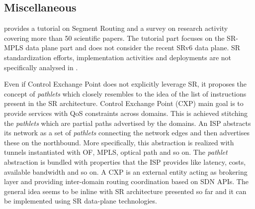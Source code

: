 \subsection{Miscellaneous}


\cite{abdullah2018segment} provides a tutorial on Segment Routing and a survey on research activity covering more than 50 scientific papers. The tutorial part focuses on the SR-MPLS data plane part and does not consider the recent SRv6 data plane. SR standardization efforts, implementation activities and deployments are not specifically analysed in \cite{abdullah2018segment}.

Even if Control Exchange Point \cite{cxp} does not explicitly leverage SR, it proposes the concept of \textit{pathlets} \cite{pathlet} which closely resembles to the idea of the list of instructions present in the SR architecture. Control Exchange Point (CXP) main goal is to provide services with QoS constraints across domains. This is achieved stitching the \textit{pathlets} which are partial paths advertised by the domains. An ISP abstracts its network as a set of \textit{pathlets} connecting the network edges and then advertises these on the northbound. More specifically, this abstraction is realized with tunnels instantiated with OF, MPLS, optical path and so on. The \textit{pathlet} abstraction is bundled with properties that the ISP provides like latency, costs, available bandwidth and so on. A CXP is an external entity acting as brokering layer and providing inter-domain routing coordination based on SDN APIs. The general idea seems to be inline with SR architecture presented so far and it can be implemented using SR data-plane technologies.

